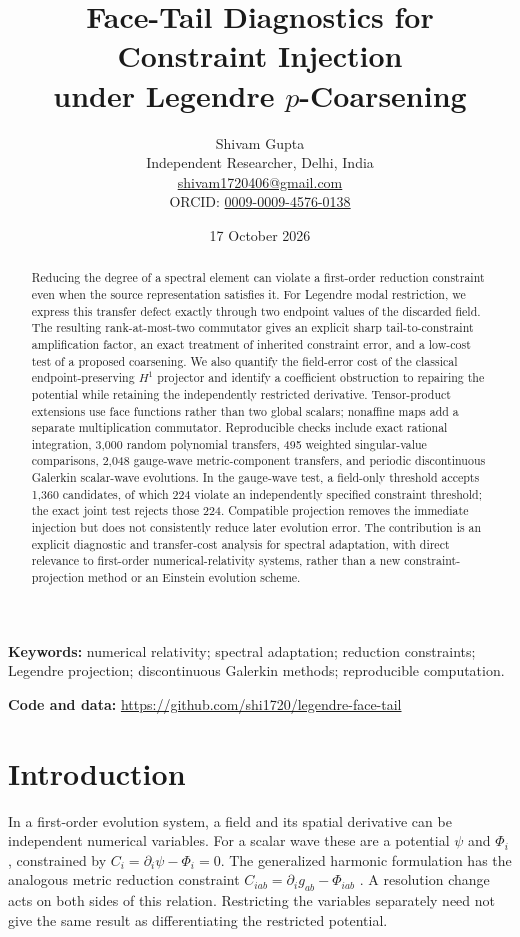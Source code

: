 \documentclass[11pt,a4paper]{article}
\title{\bfseries Face-Tail Diagnostics for Constraint Injection\\under Legendre \(p\)-Coarsening}
\author{Shivam Gupta\\[3pt]\small Independent Researcher, Delhi, India\\
\small\href{mailto:shivam1720406@gmail.com}{shivam1720406@gmail.com}\\
\small ORCID: \href{https://orcid.org/0009-0009-4576-0138}{0009-0009-4576-0138}}
\date{17 October 2026}
\theoremstyle{remark}\newtheorem{remark}[theorem]{Remark}
\begin{document}
\maketitle
\begin{abstract}
Reducing the degree of a spectral element can violate a first-order reduction
constraint even when the source representation satisfies it. For Legendre modal
restriction, we express this transfer defect exactly through two endpoint values
of the discarded field. The resulting rank-at-most-two commutator gives an
explicit sharp tail-to-constraint amplification factor, an exact treatment of
inherited constraint error, and a low-cost test of a proposed coarsening. We
also quantify the field-error cost of the classical endpoint-preserving
\(H^1\) projector and identify a coefficient obstruction to repairing the
potential while retaining the independently restricted derivative. Tensor-product
extensions use face functions rather than two global scalars; nonaffine maps add
a separate multiplication commutator. Reproducible checks include exact rational
integration, 3,000 random polynomial transfers, 495 weighted singular-value
comparisons, 2,048 gauge-wave metric-component transfers, and periodic
discontinuous Galerkin scalar-wave evolutions. In the gauge-wave test, a field-only
threshold accepts 1,360 candidates, of which 224 violate an independently specified
constraint threshold; the exact joint test rejects those 224. Compatible projection
removes the immediate injection but does not consistently reduce later evolution
error. The contribution is an explicit diagnostic and transfer-cost analysis for
spectral adaptation, with direct relevance to first-order numerical-relativity
systems, rather than a new constraint-projection method or an Einstein evolution
scheme.
\end{abstract}
\noindent\textbf{Keywords:} numerical relativity; spectral adaptation; reduction constraints;
Legendre projection; discontinuous Galerkin methods; reproducible computation.

\smallskip\noindent\textbf{Code and data:}
\url{https://github.com/shi1720/legendre-face-tail}

\section{Introduction}
In a first-order evolution system, a field and its spatial derivative can be
independent numerical variables. For a scalar wave these are a potential
\(\psi\) and \(\Phi_i\), constrained by \(C_i=\partial_i\psi-\Phi_i=0\).
The generalized harmonic formulation has the analogous metric reduction
constraint \(C_{iab}=\partial_i g_{ab}-\Phi_{iab}\)
\cite{holst2004,lindblom2006}. A resolution change acts on both sides of this
relation. Restricting the variables separately need not give the same result as
differentiating the restricted potential.
\end{document}
